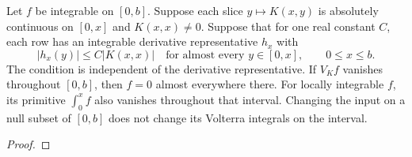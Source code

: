 \begin{theorem}
\label{thm:volterra-ac-uniqueness}
\leanok
Let $f$ be integrable on $[0,b]$. Suppose each slice $y\mapsto K(x,y)$ is
absolutely continuous on $[0,x]$ and $K(x,x)\ne0$. Suppose that for one real
constant $C$, each row has an integrable derivative representative $h_x$ with
\[
 |h_x(y)|\le C|K(x,x)|\quad\text{for almost every }y\in[0,x],\qquad 0\le x\le b.
\]
The condition is independent of the derivative representative.
If $V_Kf$ vanishes throughout $[0,b]$, then $f=0$ almost everywhere there.
For locally integrable $f$, its primitive $\int_0^x f$ also vanishes throughout
that interval. Changing the input on a null subset of $[0,b]$ does not change
its Volterra integrals on the interval.
\end{theorem}
\begin{proof}
\leanok
\end{proof}


